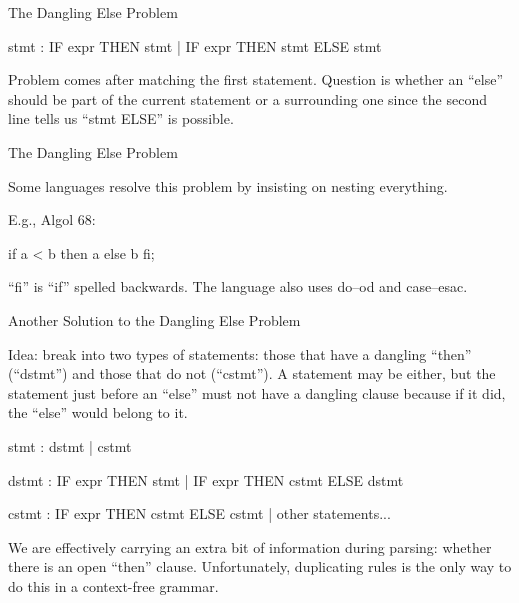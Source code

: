 \documentclass{plt}
\begin{document}
\begin{frame}[fragile]{The Dangling Else Problem}

\begin{ocamlyacc}
stmt : IF expr THEN stmt
     | IF expr THEN stmt ELSE stmt
\end{ocamlyacc}

Problem comes after matching the first statement.  Question is whether
an ``else'' should be part of the current statement or a surrounding
one since the second line tells us ``stmt ELSE'' is possible.

\end{frame}

\begin{frame}[fragile]{The Dangling Else Problem}

Some languages resolve this problem by insisting on nesting
everything.

E.g., Algol 68:

\begin{center}
\begin{algol}
if a < b then a else b fi;
\end{algol}
\end{center}

``fi'' is ``if'' spelled backwards.  The language also uses do--od and
case--esac.
\end{frame}

\begin{frame}[fragile]{Another Solution to the Dangling Else Problem}

Idea: break into two types of statements: those that have a dangling
``then'' (``dstmt'') and those that do not (``cstmt'').  A statement may be
either, but the statement just before an ``else'' must not have a
dangling clause because if it did, the ``else'' would belong to it.

\begin{ocamlyacc}
stmt : dstmt
     | cstmt

dstmt : IF expr THEN stmt
      | IF expr THEN cstmt ELSE dstmt

cstmt : IF expr THEN cstmt ELSE cstmt
      | other statements...
\end{ocamlyacc}

We are effectively carrying an extra bit of information during
parsing: whether there is an open ``then'' clause.  Unfortunately,
duplicating rules is the only way to do this in a context-free grammar.

\end{frame}
\end{document}
